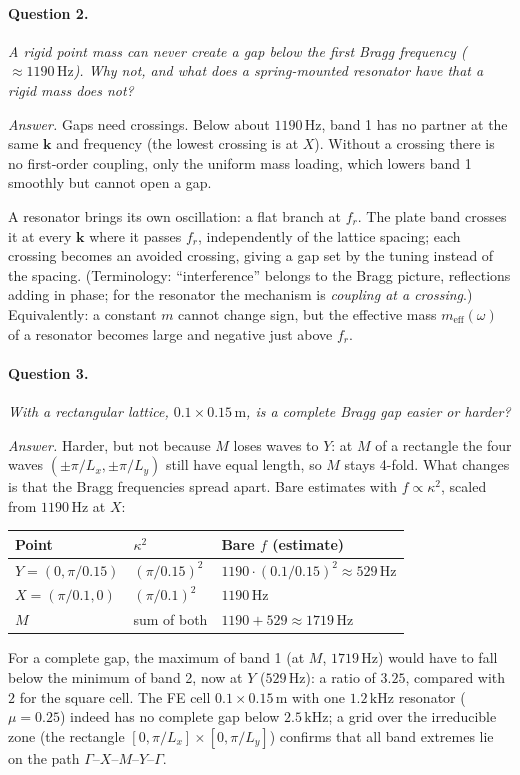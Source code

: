 \paragraph{Question 2.} \emph{A rigid point mass can never create a gap below
the first Bragg frequency ($\approx 1190\,\mathrm{Hz}$). Why not, and what does
a spring-mounted resonator have that a rigid mass does not?}

\emph{Answer.} Gaps need crossings. Below about $1190\,\mathrm{Hz}$, band 1 has
no partner at the same $\mathbf{k}$ and frequency (the lowest crossing is at
$X$). Without a crossing there is no first-order coupling, only the uniform
mass loading, which lowers band 1 smoothly but cannot open a gap.

A resonator brings its own oscillation: a flat branch at $f_r$. The plate band
crosses it at every $\mathbf{k}$ where it passes $f_r$, independently of the
lattice spacing; each crossing becomes an avoided crossing, giving a gap set
by the tuning instead of the spacing. (Terminology: ``interference'' belongs
to the Bragg picture, reflections adding in phase; for the resonator the
mechanism is \emph{coupling at a crossing}.) Equivalently: a constant $m$
cannot change sign, but the effective mass $m_\mathrm{eff}(\omega)$ of a
resonator becomes large and negative just above $f_r$.

\paragraph{Question 3.} \emph{With a rectangular lattice,
$0.1 \times 0.15\,\mathrm{m}$, is a complete Bragg gap easier or harder?}

\emph{Answer.} Harder, but not because $M$ loses waves to $Y$: at $M$ of a
rectangle the four waves $(\pm\pi/L_x, \pm\pi/L_y)$ still have equal length,
so $M$ stays 4-fold. What changes is that the Bragg frequencies spread apart.
Bare estimates with $f \propto \kappa^2$, scaled from $1190\,\mathrm{Hz}$ at
$X$:
\begin{center}
\begin{tabular}{|l|l|l|}
\hline
Point & $\kappa^2$ & Bare $f$ (estimate) \\
\hline
$Y = (0, \pi/0.15)$ & $(\pi/0.15)^2$ & $1190 \cdot (0.1/0.15)^2 \approx 529\,\mathrm{Hz}$ \\
$X = (\pi/0.1, 0)$ & $(\pi/0.1)^2$ & $1190\,\mathrm{Hz}$ \\
$M$ & sum of both & $1190 + 529 \approx 1719\,\mathrm{Hz}$ \\
\hline
\end{tabular}
\end{center}
For a complete gap, the maximum of band 1 (at $M$, $1719\,\mathrm{Hz}$) would
have to fall below the minimum of band 2, now at $Y$ ($529\,\mathrm{Hz}$): a
ratio of $3.25$, compared with $2$ for the square cell. The FE cell
$0.1 \times 0.15\,\mathrm{m}$ with one $1.2\,\mathrm{kHz}$ resonator ($\mu = 0.25$)
indeed has no complete gap below $2.5\,\mathrm{kHz}$; a grid over the irreducible zone
(the rectangle $[0, \pi/L_x] \times [0, \pi/L_y]$) confirms that all band extremes lie
on the path $\Gamma$--$X$--$M$--$Y$--$\Gamma$.

